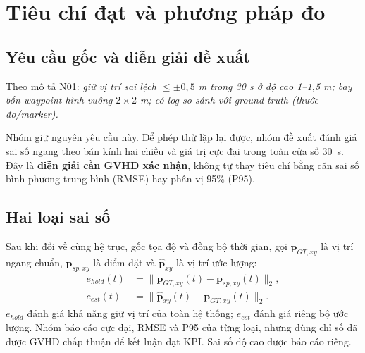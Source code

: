 \documentclass[a4paper,12pt]{article}
\begin{document}
\section{Tiêu chí đạt và phương pháp đo}
\subsection{Yêu cầu gốc và diễn giải đề xuất}
Theo mô tả N01\cite{assignment}: \textit{giữ vị trí sai lệch $\leq\pm0{,}5$ m trong 30 s ở độ cao 1--1,5 m; bay bốn waypoint hình vuông $2\times2$ m; có log so sánh với ground truth (thước đo/marker).}

Nhóm giữ nguyên yêu cầu này. Để phép thử lặp lại được, nhóm đề xuất đánh giá sai số ngang theo bán kính hai chiều và giá trị cực đại trong toàn cửa sổ 30~s. Đây là \textbf{diễn giải cần GVHD xác nhận}, không tự thay tiêu chí bằng căn sai số bình phương trung bình (RMSE) hay phân vị 95\% (P95).

\subsection{Hai loại sai số}
Sau khi đổi về cùng hệ trục, gốc tọa độ và đồng bộ thời gian, gọi $\mathbf p_{GT,xy}$ là vị trí ngang chuẩn, $\mathbf p_{sp,xy}$ là điểm đặt và $\hat{\mathbf p}_{xy}$ là vị trí ước lượng:
\begin{align}
 e_{hold}(t)&=\|\mathbf p_{GT,xy}(t)-\mathbf p_{sp,xy}(t)\|_2,\\
 e_{est}(t)&=\|\hat{\mathbf p}_{xy}(t)-\mathbf p_{GT,xy}(t)\|_2.
\end{align}
$e_{hold}$ đánh giá khả năng giữ vị trí của toàn hệ thống; $e_{est}$ đánh giá riêng bộ ước lượng. Nhóm báo cáo cực đại, RMSE và P95 của từng loại, nhưng dùng chỉ số đã được GVHD chấp thuận để kết luận đạt KPI. Sai số độ cao được báo cáo riêng.
\end{document}
